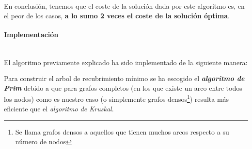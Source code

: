 \documentclass{article}
\newcommand{\myparagraph}[1]{\paragraph{#1}\mbox{}\\}
\begin{document}
En conclusión, tenemos que el coste de la solución dada por este algoritmo es, en el peor de los casos, \textbf{a lo sumo 2 veces el coste de la solución óptima}.

\myparagraph{Implementación}

El algoritmo previamente explicado ha sido implementado de la siguiente manera:


Para construir el arbol de recubrimiento mínimo se ha escogido el \textbf{\textit{algoritmo de Prim}} debido a que para grafos completos (en los que existe un arco entre todos los nodos) como es nuestro caso (o simplemente grafos densos\footnote{Se llama grafos densos a aquellos que tienen muchos arcos respecto a su número de nodos}) resulta más eficiente que el \textit{algoritmo de Kruskal}. 
\newline
\end{document}
